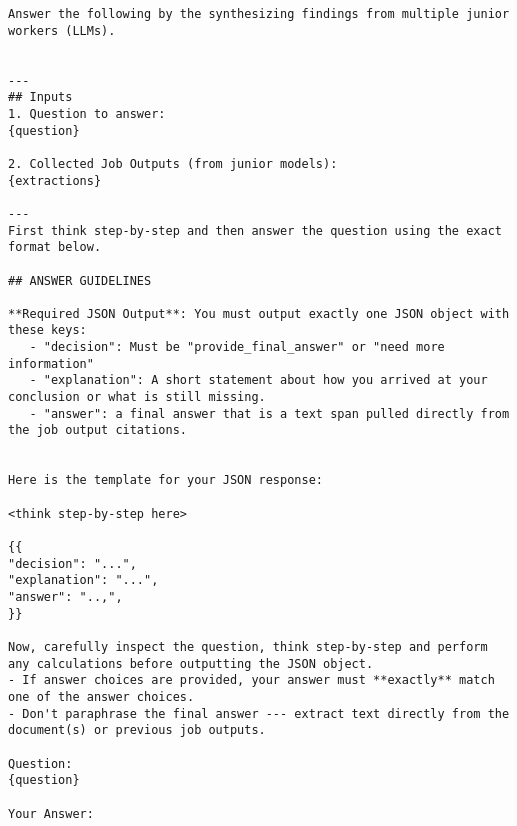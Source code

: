 \begin{tcolorbox}[colback=gray!10,  width=\textwidth]
\begin{lstlisting}[breaklines]
Answer the following by the synthesizing findings from multiple junior workers (LLMs).


---
## Inputs
1. Question to answer:
{question}

2. Collected Job Outputs (from junior models):
{extractions}

---
First think step-by-step and then answer the question using the exact format below.

## ANSWER GUIDELINES

**Required JSON Output**: You must output exactly one JSON object with these keys:
   - "decision": Must be "provide_final_answer" or "need more information"
   - "explanation": A short statement about how you arrived at your conclusion or what is still missing.
   - "answer": a final answer that is a text span pulled directly from the job output citations.

     
Here is the template for your JSON response:

<think step-by-step here>

{{
"decision": "...",
"explanation": "...",
"answer": "..,", 
}}

Now, carefully inspect the question, think step-by-step and perform any calculations before outputting the JSON object. 
- If answer choices are provided, your answer must **exactly** match one of the answer choices.
- Don't paraphrase the final answer --- extract text directly from the document(s) or previous job outputs.

Question: 
{question}

Your Answer:
\end{lstlisting}
\end{tcolorbox}

